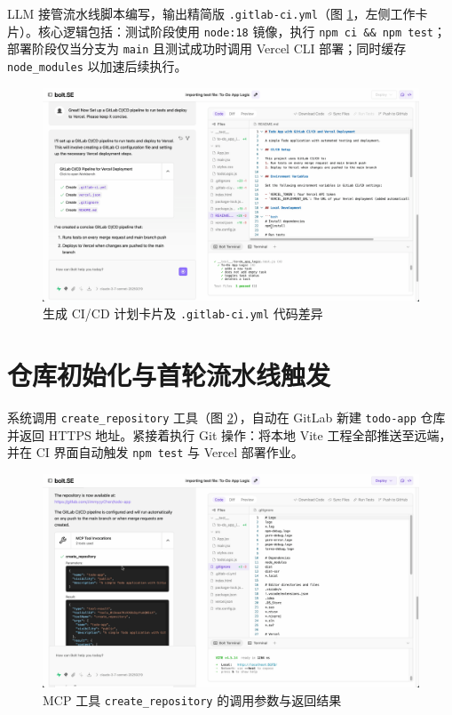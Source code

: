 LLM 接管流水线脚本编写，输出精简版 \texttt{.gitlab-ci.yml}（图 \ref{fig:ci_plan}，左侧工作卡片）。核心逻辑包括：测试阶段使用 \texttt{node:18} 镜像，执行 \texttt{npm ci \&\& npm test}；部署阶段仅当分支为 \texttt{main} 且测试成功时调用 Vercel CLI 部署；同时缓存 \texttt{node\_modules} 以加速后续执行。

\begin{figure}
  \centering
  \includegraphics[width=\textwidth]{figures/screenshots/ci-cd/ci_plan.png}
  \caption{生成 CI/CD 计划卡片及 \texttt{.gitlab-ci.yml} 代码差异}
  \label{fig:ci_plan}
\end{figure}

\section{仓库初始化与首轮流水线触发}

系统调用 \texttt{create\_repository} 工具（图 \ref{fig:mcp_invocation}），自动在 GitLab 新建 \texttt{todo-app} 仓库并返回 HTTPS 地址。紧接着执行 Git 操作：将本地 Vite 工程全部推送至远端，并在 CI 界面自动触发 \texttt{npm test} 与 Vercel 部署作业。

\begin{figure}
  \centering
  \includegraphics[width=\textwidth]{figures/screenshots/ci-cd/mcp_invocation.png}
  \caption{MCP 工具 \texttt{create\_repository} 的调用参数与返回结果}
  \label{fig:mcp_invocation}
\end{figure}

